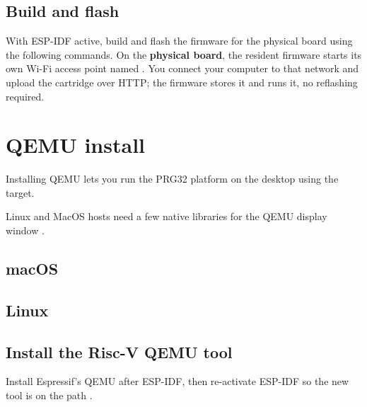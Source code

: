 \subsection{Build and flash}

With ESP-IDF active, build and flash the firmware for the physical board using the
following commands. On the \textbf{physical board}, the resident firmware starts its own Wi-Fi access
point named . You connect your computer to that network and upload the
cartridge over HTTP; the firmware stores it and runs it, no reflashing required.



\section{QEMU install}

Installing QEMU lets you run the PRG32 platform on the desktop using the
 target.

Linux and MacOS hosts need a few native libraries for the QEMU display window
\citep{prg32qemu}.

\subsection{macOS}



\subsection{Linux}



\subsection{Install the Risc-V QEMU tool}

Install Espressif's \riscv QEMU after ESP-IDF, then re-activate ESP-IDF so the
new tool is on the path \citep{prg32qemu}.



